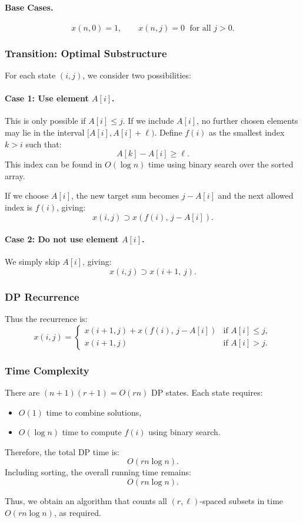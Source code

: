 \documentclass[9pt]{extarticle}
\begin{document}
\paragraph{Base Cases.}
\[
x(n,0) = 1, \qquad
x(n,j) = 0 \;\text{ for all } j > 0.
\]

\subsubsection*{Transition: Optimal Substructure}
For each state \((i,j)\), we consider two possibilities:

\paragraph{Case 1: Use element \(A[i]\).}
This is only possible if \(A[i] \le j\).  
If we include \(A[i]\), no further chosen elements may lie in the interval
\([A[i], A[i]+\ell)\).  
Define \(f(i)\) as the smallest index \(k > i\) such that:
\[
A[k] - A[i] \ge \ell.
\]
This index can be found in \(O(\log n)\) time using binary search over the sorted array.

If we choose \(A[i]\), the new target sum becomes \(j - A[i]\) and the next
allowed index is \(f(i)\), giving:
\[
x(i,j) \supset x(f(i),\, j - A[i]).
\]

\paragraph{Case 2: Do not use element \(A[i]\).}
We simply skip \(A[i]\), giving:
\[
x(i,j) \supset x(i+1,\, j).
\]

\subsubsection*{DP Recurrence}
Thus the recurrence is:
\[
x(i,j) =
\begin{cases}
    x(i+1,j) + x(f(i),\, j - A[i]) & \text{if } A[i] \le j,\\[3pt]
    x(i+1,j)                       & \text{if } A[i] > j.
\end{cases}
\]

\subsubsection*{Time Complexity}
There are \((n+1)(r+1) = O(rn)\) DP states.  
Each state requires:
\begin{itemize}
    \item \(O(1)\) time to combine solutions,
    \item \(O(\log n)\) time to compute \(f(i)\) using binary search.
\end{itemize}
Therefore, the total DP time is:
\[
O(rn \log n).
\]
Including sorting, the overall running time remains:
\[
\boxed{O(rn \log n)}.
\]

Thus, we obtain an algorithm that counts all \((r,\ell)\)-spaced subsets in time
\(O(rn \log n)\), as required.
\end{document}
